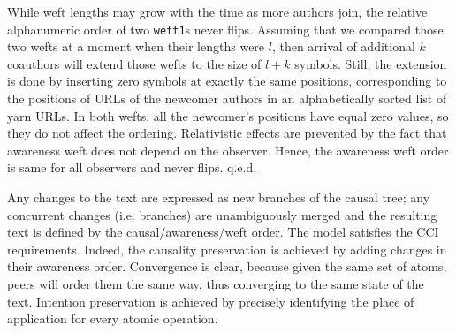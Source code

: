 \documentclass{acm_proc_article-sp}
\begin{document}
While weft lengths may grow with the time as more authors join, the relative alphanumeric order of two {\tt weft1}s never flips.
Assuming that we compared those two wefts at a moment when their lengths were $l$, then arrival of additional $k$ coauthors will extend those wefts to the size of $l+k$ symbols.
Still, the extension is done by inserting zero symbols at exactly the same positions, corresponding to the positions of URLs of the newcomer authors in an alphabetically sorted list of yarn URLs.
In both wefts, all the newcomer's positions have equal zero values, so they do not affect the ordering.
Relativistic effects are prevented by the fact that awareness weft does not depend on the observer.
Hence, the awareness weft order is same for all observers and never flips. q.e.d.

Any changes to the text are expressed as new branches  of the causal tree; any concurrent changes (i.e. branches) are unambiguously merged and the resulting text is defined by the causal/awareness/weft order.
The model satisfies the CCI requirements.
Indeed, the causality preservation is achieved by adding changes in their awareness order.
Convergence is clear, because given the same set of atoms, peers will order them the same way, thus converging to the same state of the text.
Intention preservation is achieved by precisely identifying the place of application for every atomic operation.
\end{document}
